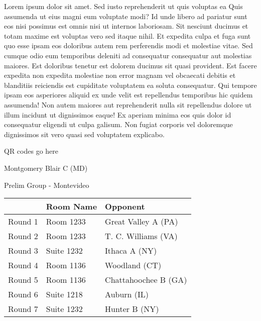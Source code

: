 \documentclass{article}%
\begin{document}
\vspace*{8pt}%
\linebreak%
\newline%
\newline%
Lorem ipsum dolor sit amet. Sed iusto reprehenderit ut quis voluptas ea Quis assumenda ut eius magni eum voluptate modi? Id unde libero ad pariatur sunt eos nisi possimus est omnis nisi ut internos laboriosam. Sit nesciunt ducimus et totam maxime est voluptas vero sed itaque nihil. Et expedita culpa et fuga sunt quo esse ipsam eos doloribus autem rem perferendis modi et molestiae vitae.\newline%
\newline%
Sed cumque odio eum temporibus deleniti ad consequatur consequatur aut molestias maiores. Est doloribus tenetur est dolorem ducimus sit quasi provident. Est facere expedita non expedita molestiae non error magnam vel obcaecati debitis et blanditiis reiciendis est cupiditate voluptatem ea soluta consequatur. Qui tempore ipsam eos asperiores aliquid ex unde velit est repellendus temporibus hic quidem assumenda!\newline%
\newline%
Non autem maiores aut reprehenderit nulla sit repellendus dolore ut illum incidunt ut dignissimos eaque! Ex aperiam minima eos quis dolor id consequatur eligendi ut culpa galisum. Non fugiat corporis vel doloremque dignissimos sit vero quasi sed voluptatem explicabo.\newline%
\newline%
%
\vspace*{30pt}%
\begin{center}%
\begin{Huge}%
QR codes go here%
\end{Huge}%
\end{center}%
\newpage%
%
\begin{center}%
\begin{Huge}%
Montgomery Blair C (MD)%
\end{Huge}%
\vspace*{8pt}%
\linebreak%
\begin{Large}%
Prelim Group {-} Montevideo%
\end{Large}%
\end{center}%
\begin{tabularx}{\textwidth}{|c|Y|Y|}%
\hline%
&Room Name&Opponent\\%
\hline%
Round 1&Room 1233&Great Valley A (PA)\\%
Round 2&Room 1233&T. C. Williams (VA)\\%
Round 3&Suite 1232&Ithaca A (NY)\\%
Round 4&Room 1136&Woodland (CT)\\%
Round 5&Room 1136&Chattahoochee B (GA)\\%
Round 6&Suite 1218&Auburn (IL)\\%
Round 7&Suite 1232&Hunter B (NY)\\%
\hline%
\end{tabularx}%
\end{document}
